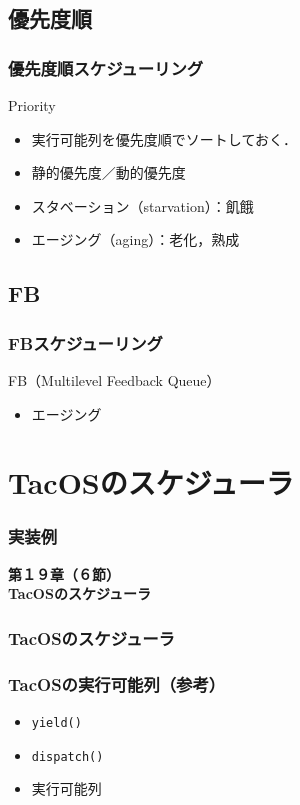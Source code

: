 \documentclass[unicode,handout]{beamer}                   %
\begin{document}
\subsection{優先度順}
\begin{frame}
  \frametitle{優先度順スケジューリング}
  Priority
  \vfill
  \begin{itemize}
  \item 実行可能列を優先度順でソートしておく．
  \end{itemize}
  \vfill
  \vfill
  \begin{itemize}
    \item 静的優先度／動的優先度
    \item スタベーション（starvation）：飢餓
    \item エージング（aging）：老化，熟成
  \end{itemize}
  \vfill
\end{frame}

\subsection{FB}
\begin{frame}
  \frametitle{FBスケジューリング}
  FB（Multilevel Feedback Queue）\\
  \vfill
  \vfill
  \begin{itemize}
    \item エージング
  \end{itemize}
  \vfill
\end{frame}

\section{TacOSのスケジューラ}
\begin{frame}
  \frametitle{実装例}
  \vfill
  \begin{center}
    \textbf{\LARGE 第１９章（６節）} \\
    \textbf{\Huge TacOSのスケジューラ} \\
    \vfill
  \end{center}
  \vfill
\end{frame}

\begin{frame}[fragile]
  \frametitle{TacOSのスケジューラ}
  \vfill
\end{frame}

\begin{frame}
  \frametitle{TacOSの実行可能列（参考）}
  \begin{itemize}
  \item {\tt yield()}
  \item {\tt dispatch()}
    \vfill
  \item 実行可能列
  \end{itemize}
  \vfill
\end{frame}
\end{document}
